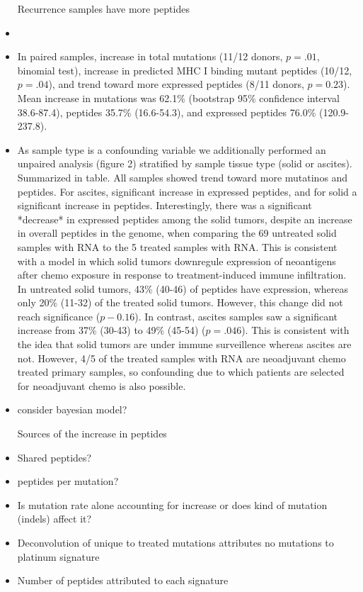 \begin{itemize}
Recurrence samples have more peptides
\item 
\item In paired samples, increase in total mutations (11/12 donors, $p=.01$, binomial test), increase in predicted MHC I binding mutant peptides (10/12, $p=.04$), and trend toward more expressed peptides (8/11 donors, $p=0.23$).  Mean increase in mutations was 62.1\% (bootstrap 95\% confidence interval 38.6-87.4), peptides 35.7\% (16.6-54.3), and expressed peptides 76.0\% (120.9-237.8).
\item As sample type is a confounding variable we additionally performed an unpaired analysis (figure 2) stratified by sample tissue type (solid or ascites). Summarized in table. All samples showed trend toward more mutatinos and peptides. For ascites, significant increase in expressed peptides, and for solid a significant increase in peptides. Interestingly, there was a significant *decrease* in expressed peptides among the solid tumors, despite an increase in overall peptides in the genome, when comparing the 69 untreated solid samples with RNA to the 5 treated samples with RNA.  This is consistent with a model in which solid tumors downregule expression of neoantigens after chemo exposure in response to treatment-induced immune infiltration. In untreated solid tumors, 43\% (40-46) of peptides have expression, whereas only 20\% (11-32) of the treated solid tumors. However, this change did not reach significance ($p-0.16$). In contrast, ascites samples saw a significant increase from 37\% (30-43) to 49\% (45-54) ($p=.046$). This is consistent with the idea that solid tumors are under immune surveillence whereas ascites are not. However, 4/5 of the treated samples with RNA are neoadjuvant chemo treated primary samples, so confounding due to which patients are selected for neoadjuvant chemo is also possible.


\item consider bayesian model?

Sources of the increase in peptides
\item Shared peptides?
\item peptides per mutation?
\item Is mutation rate alone accounting for increase or does kind of mutation (indels) affect it?

\item Deconvolution of unique to treated mutations attributes no mutations to platinum signature
\item Number of peptides attributed to each signature
\end{itemize}

